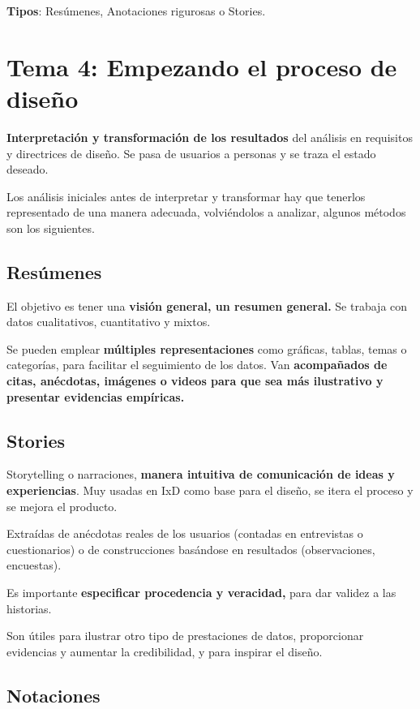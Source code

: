 \documentclass[12pt, twoside, openright]{report} %
\begin{document}
\textbf{Tipos}: Resúmenes, Anotaciones rigurosas o Stories.

\chapter{Tema 4: Empezando el proceso de diseño}

\textbf{Interpretación y transformación de los resultados} del análisis
en requisitos y directrices de diseño. Se pasa de usuarios a personas y
se traza el estado deseado.

Los análisis iniciales antes de interpretar y transformar hay que
tenerlos representado de una manera adecuada, volviéndolos a analizar,
algunos métodos son los siguientes.

\section{Resúmenes}

El objetivo es tener una \textbf{visión general, un resumen general.} Se
trabaja con datos cualitativos, cuantitativo y mixtos.

Se pueden emplear \textbf{múltiples representaciones} como gráficas,
tablas, temas o categorías, para facilitar el seguimiento de los datos.
Van \textbf{acompañados de citas, anécdotas, imágenes o videos para que
sea más ilustrativo y presentar evidencias empíricas.}

\section{Stories}

Storytelling o narraciones, \textbf{manera intuitiva de comunicación de
ideas y experiencias}. Muy usadas en IxD como base para el diseño, se
itera el proceso y se mejora el producto.

Extraídas de anécdotas reales de los usuarios (contadas en entrevistas o
cuestionarios) o de construcciones basándose en resultados (observaciones,
encuestas).

Es importante \textbf{especificar procedencia y veracidad,} para dar
validez a las historias.

Son útiles para ilustrar otro tipo de prestaciones de datos,
proporcionar evidencias y aumentar la credibilidad, y para inspirar el
diseño.

\section{Notaciones}
\end{document}
